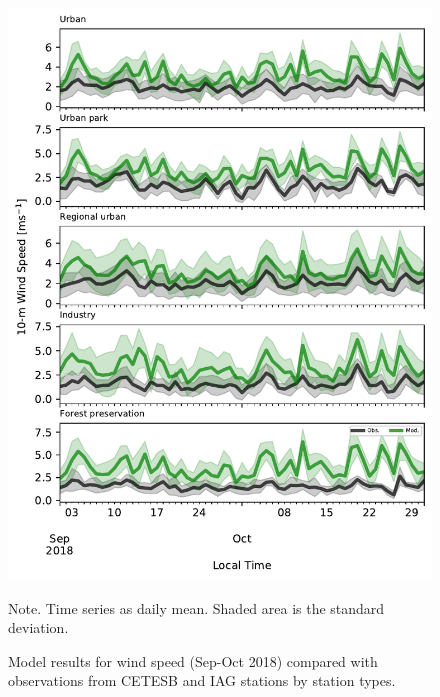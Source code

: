 \begin{figure}[hbt]
  \begin{center}
    \includegraphics[width=.8\textwidth]{fig/ws_cetesb}
  \end{center}
  \caption{Model results for wind speed (Sep-Oct 2018) compared with observations from CETESB and IAG stations by station types.}
  {\scriptsize Note. Time series as daily mean. Shaded area is the standard deviation.}
  \label{fig:ws_cetesb}
\end{figure}
  
